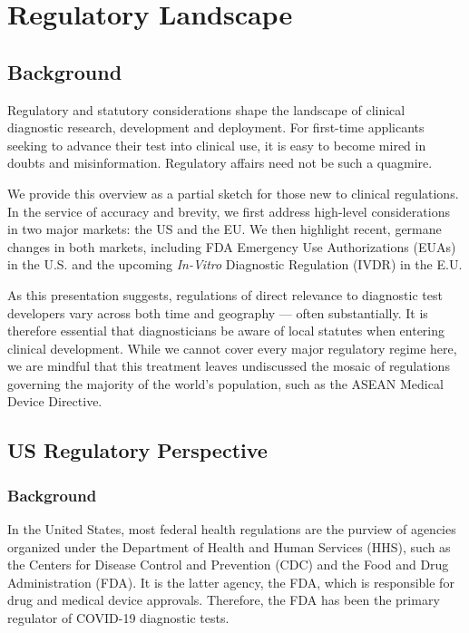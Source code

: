 \section{Regulatory Landscape}
    \label{sec:regs}

    \subsection{Background}
    
        Regulatory and statutory considerations shape the landscape of clinical diagnostic research, development and deployment. For first-time applicants seeking to advance their test into clinical use, it is easy to become mired in doubts and misinformation. Regulatory affairs need not be such a quagmire.

        We provide this overview as a partial sketch for those new to clinical regulations. In the service of accuracy and brevity, we first address high-level considerations in two major markets: the US and the EU. We then highlight recent, germane changes in both markets, including FDA Emergency Use Authorizations (EUAs) in the U.S. and the upcoming \emph{In-Vitro} Diagnostic Regulation (IVDR) in the E.U.

        As this presentation suggests, regulations of direct relevance to diagnostic test developers vary across both time and geography — often substantially. It is therefore essential that diagnosticians be aware of local statutes when entering clinical development. While we cannot cover every major regulatory regime here, we are mindful that this treatment leaves undiscussed the mosaic of regulations governing the majority of the world’s population, such as the ASEAN Medical Device Directive.\cite{PacificBridge2018}

    \subsection{US Regulatory Perspective}

        \subsubsection{Background}

            In the United States, most federal health regulations are the purview of agencies organized under the Department of Health and Human Services (HHS), such as the Centers for Disease Control and Prevention (CDC) and the Food and Drug Administration (FDA). It is the latter agency, the FDA, which is responsible for drug and medical device approvals. Therefore, the FDA has been the primary regulator of COVID-19 diagnostic tests.

